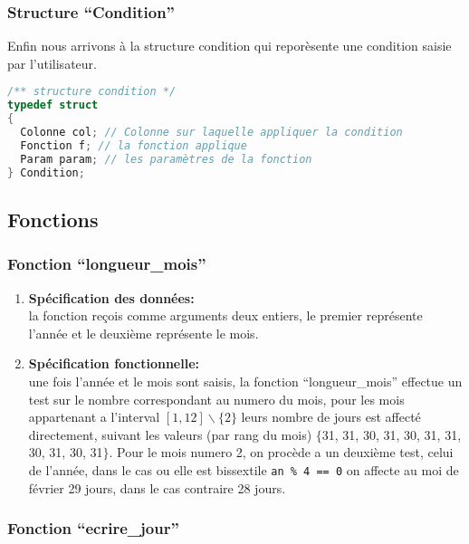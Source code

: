 \subsubsection{Structure ``Condition''}
Enfin nous arrivons à la structure condition qui reporèsente une condition
saisie par l'utilisateur.

\begin{lstlisting}[language=C]
/** structure condition */
typedef struct
{
  Colonne col; // Colonne sur laquelle appliquer la condition
  Fonction f; // la fonction applique
  Param param; // les paramètres de la fonction
} Condition;
\end{lstlisting}

\subsection{Fonctions}
\subsubsection{Fonction ``longueur\_mois''}

\begin{enumerate}[label=\textbf{\Alph* --}]
	\item \textbf{Spécification des données: \\}
	la fonction reçois comme arguments deux entiers, le premier représente l’année et le 
deuxième représente le mois. 
		
    \item \textbf{Spécification fonctionnelle: \\}
    une fois l’année et le mois sont saisis, la fonction ``longueur\_mois'' effectue un test
sur le nombre correspondant au numero du mois, pour les mois appartenant a l’interval
$[1, 12] \backslash \{2\}$ leurs nombre de jours est affecté directement, suivant les valeurs (par rang du mois) 
$\{$31, 31, 30, 31, 30, 31, 31, 30, 31, 30, 31$\}$. Pour le mois numero 2, on procède a un deuxième test,
 celui de l’année, dans le cas ou elle est bissextile \lstinline$an % 4 == 0$ on affecte au moi de février
  29 jours, dans le cas contraire 28 jours.
\end{enumerate}

\subsubsection{Fonction ``ecrire\_jour''}

